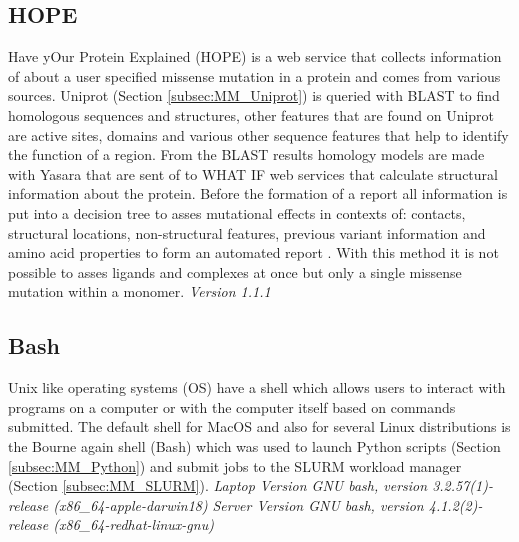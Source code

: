 \subsection{HOPE}
Have yOur Protein Explained (HOPE) is a web service that collects information of about a user specified missense mutation in a protein and comes from various sources. Uniprot (Section \ref{subsec:MM_Uniprot}) is queried with BLAST to find homologous sequences and structures, other features that are found on Uniprot are active sites, domains and various other sequence features that help to identify the function of a region. From the BLAST results homology models are made with Yasara that are sent of to WHAT IF web services that calculate structural information about the protein. Before the formation of a report all information is put into a decision tree to asses mutational effects in contexts of: contacts, structural locations, non-structural features, previous variant information and amino acid properties to form an automated report \cite{venselaar_protein_2010,cmbi_hope_nodate,cmbi_hope_nodate-1,cmbi_hope_nodate-2}.
With this method it is not possible to asses ligands and complexes at once but only a single missense mutation within a monomer.
\label{subsec:MM_HOPE}
\textit{Version 1.1.1}

\subsection{Bash}
Unix like operating systems (OS) have a shell which allows users to interact with programs on a computer or with the computer itself based on commands submitted.  The default shell for MacOS and also for several Linux distributions is the Bourne again shell (Bash) which was used to launch Python scripts (Section \ref{subsec:MM_Python}) and submit jobs to the SLURM workload manager (Section \ref{subsec:MM_SLURM}). 
\label{subsec:MM_Bash}
\newline
\textit{Laptop Version GNU bash, version 3.2.57(1)-release (x86\_64-apple-darwin18)}
\newline
\textit{Server Version GNU bash, version 4.1.2(2)-release (x86\_64-redhat-linux-gnu)}

